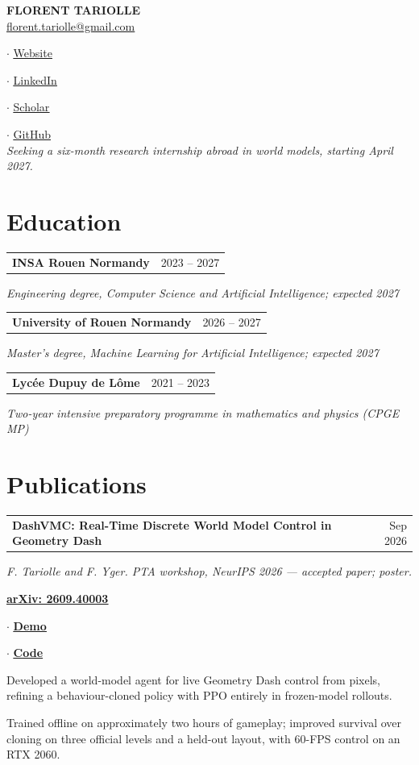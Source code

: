 \documentclass[11pt,a4paper]{article}
\makeatletter
\let\plainhref\href
\renewcommand{\href}[2]{%
  \plainhref{#1}{\uline{#2}}%
}
\newcommand{\entry}[3]{%
  \Needspace{5\baselineskip}%
  \vspace{3pt}%
  {\setlength{\parskip}{0pt}%
    \begin{tabularx}{\linewidth}{@{}>{\raggedright\arraybackslash}Xr@{}}%
      \textbf{#1} & {\small\color{muted} #2}\\%
    \end{tabularx}\par\nobreak
    {\small\color{muted}\textit{#3}}\par\nobreak
  }\vspace{2pt}\nobreak
}
\newcommand{\resourcelink}[2]{%
  \href{#1}{\textbf{#2}}%
}
\newcommand{\resourcelinks}[1]{%
  {\setlength{\parskip}{0pt}%
    \par{\small #1}\par\nobreak
  }%
}
\newenvironment{highlights}{%
  \begin{list}{\textbullet}{%
    \setlength{\leftmargin}{12pt}%
    \setlength{\labelsep}{5pt}%
    \setlength{\topsep}{2pt}%
    \setlength{\partopsep}{0pt}%
    \setlength{\parsep}{0pt}%
    \setlength{\itemsep}{2pt}%
  }%
}{%
  \end{list}%
}
\makeatother
\begin{document}
\thispagestyle{firstpage}

{\centering
  {\LARGE\bfseries FLORENT TARIOLLE}\\[4pt]
  \href{mailto:florent.tariolle@gmail.com}{florent.tariolle@gmail.com}
  \quad$\cdot$\quad\href{https://tariolle.github.io/}{Website}
  \quad$\cdot$\quad\href{https://www.linkedin.com/in/florent-tariolle/}{LinkedIn}
  \quad$\cdot$\quad\href{https://scholar.google.com/citations?user=z5QWV8kAAAAJ}{Scholar}
  \quad$\cdot$\quad\href{https://github.com/Tariolle}{GitHub}\\[4pt]
  \textit{Seeking a six-month research internship abroad in world models, starting April 2027.}
  \par}

\section*{Education}
\entry{INSA Rouen Normandy}{2023 -- 2027}{Engineering degree, Computer Science and Artificial Intelligence; expected 2027}

\entry{University of Rouen Normandy}{2026 -- 2027}{Master's degree, Machine Learning for Artificial Intelligence; expected 2027}

\entry{Lyc\'ee Dupuy de L\^ome}{2021 -- 2023}{Two-year intensive preparatory programme in mathematics and physics (CPGE MP)}

\section*{Publications}
\entry{DashVMC: Real-Time Discrete World Model Control in Geometry Dash}{Sep 2026}{F. Tariolle and F. Yger. PTA workshop, NeurIPS 2026 --- accepted paper; poster.}
\resourcelinks{\resourcelink{https://arxiv.org/abs/2609.40003}{arXiv: 2609.40003}
  \enspace$\cdot$\enspace\resourcelink{https://tariolle.github.io/dash-vmc/}{Demo}
  \enspace$\cdot$\enspace
  \resourcelink{https://github.com/Tariolle/dash-vmc}{Code}}
\begin{highlights}
  \item Developed a world-model agent for live Geometry Dash control from pixels,
    refining a behaviour-cloned policy with PPO entirely in frozen-model rollouts.
  \item Trained offline on approximately two hours of gameplay; improved
    survival over cloning on three official levels and a held-out layout, with
    60-FPS control on an RTX 2060.
\end{highlights}
\end{document}
